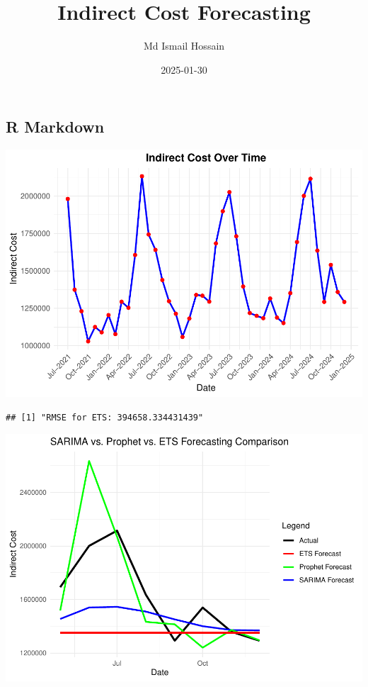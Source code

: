 \documentclass[
]{article}
\title{Indirect Cost Forecasting}
\author{Md Ismail Hossain}
\date{2025-01-30}
\begin{document}
\maketitle

\subsection{R Markdown}\label{r-markdown}

\includegraphics{Indirect-Cost-Forecasting_files/figure-latex/unnamed-chunk-1-1.pdf}

\begin{verbatim}
## [1] "RMSE for ETS: 394658.334431439"
\end{verbatim}

\includegraphics{Indirect-Cost-Forecasting_files/figure-latex/unnamed-chunk-3-1.pdf}
\end{document}
